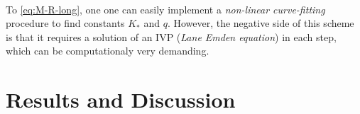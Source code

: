 \documentclass[letterpaper,12pt]{article}
\begin{document}
\paragraph{} To \eqref{eq:M-R-long}, one one can easily implement a \textit{non-linear curve-fitting} procedure to find constants $K_*$ and $q$. However, the negative side of this scheme is that it requires a solution of an IVP (\textit{Lane Emden equation}) in each step, which can be computationaly very demanding.



\section{Results and Discussion}


\label{sec:resdis}
\end{document}
